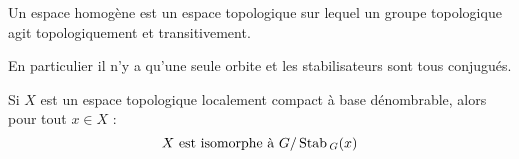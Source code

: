 \begin{defi}
 
Un espace homogène est un espace topologique sur lequel un groupe topologique
agit topologiquement et transitivement.

En particulier il n'y a qu'une seule orbite et les stabilisateurs sont tous
conjugués.
\end{defi}

\begin{theo}
 Si $X$ est un espace topologique localement compact à base dénombrable, alors
pour tout $x \in X$ :
\begin{displaymath}
 X \text{ est isomorphe à } G/\operatorname{Stab\,}_G (x)
\end{displaymath}

\end{theo}
























